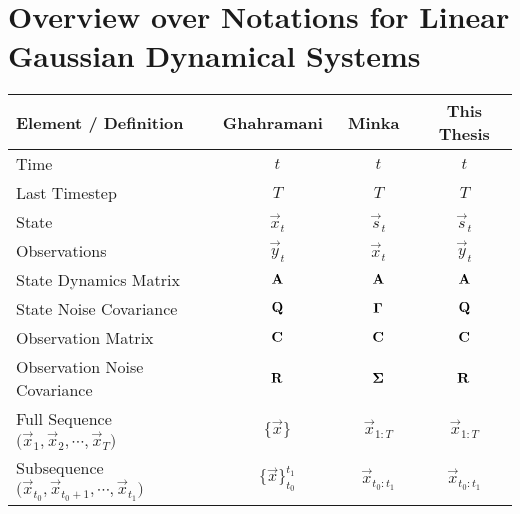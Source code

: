 	\section*{Overview over Notations for Linear Gaussian Dynamical Systems}
		\begin{table}[ht]
			\centering
			\begin{tabular}{l|ccc}
				\textbf{Element / Definition} & \textbf{Ghahramani}~\cite{ghahramaniParameterEstimationLinear1996} & \textbf{Minka}~\cite{minkaHiddenMarkovModels1999} & \textbf{This Thesis} \\ \hline
				Time                         & \( t \)                         & \( t \)                 & \( t \)                                                    \\
				Last Timestep                & \( T \)                         & \( T \)                 & \( T \)                                                    \\
				State                        & \( \vec{x}_t \)                 & \( \vec{s}_t \)         & \( \vec{s}_t \)                                            \\
				Observations                 & \( \vec{y}_t \)                 & \( \vec{x}_t \)         & \( \vec{y}_t \)                                            \\
				State Dynamics Matrix        & \( \boldsymbol{\mathrm{A}} \)                   & \( \boldsymbol{\mathrm{A}} \)           & \( \boldsymbol{\mathrm{A}} \)                                              \\
				State Noise Covariance       & \( \boldsymbol{\mathrm{Q}} \)                   & \( \boldsymbol{\mathrm{\Gamma}} \)      & \( \boldsymbol{\mathrm{Q}} \)                                              \\
				Observation Matrix           & \( \boldsymbol{\mathrm{C}} \)                   & \( \boldsymbol{\mathrm{C}} \)           & \( \boldsymbol{\mathrm{C}} \)                                              \\
				Observation Noise Covariance & \( \boldsymbol{\mathrm{R}} \)                   & \( \boldsymbol{\mathrm{\Sigma}} \)      & \( \boldsymbol{\mathrm{R}} \)                                              \\
				Full Sequence \( \big( \vec{x}_1, \vec{x}_2, \cdots, \vec{x}_T \big) \)
				                             & \( \{ \vec{x} \} \)             & \( \vec{x}_{1:T} \)     & \( \vec{x}_{1:T} \)                                        \\
				Subsequence \( \big( \vec{x}_{t_0}, \vec{x}_{t_0 + 1}, \cdots, \vec{x}_{t_1} \big) \)
				                             & \( \{ \vec{x} \}_{t_0}^{t_1} \) & \( \vec{x}_{t_0:t_1} \) & \( \vec{x}_{t_0:t_1} \)                                    \\

\end{tabular}
\end{table}
